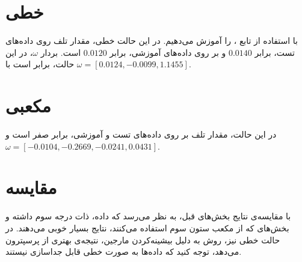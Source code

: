 \documentclass[a4paper]{article}
\begin{document}
\section{
خطی
}
 با استفاده از تابع 
،
را آموزش می‌دهیم. در این حالت خطی، مقدار تلف روی داده‌های تست، برابر 
$0.0140$
و بر روی داده‌های آموزشی، برابر 
$0.0120$
است. بردار 
$\omega$،
در این حالت، برابر است با
$\omega = [
0.0124,
-0.0099,
1.1455]$.


\section{
مکعبی
}
در این حالت، مقدار تلف بر روی داده‌های تست و آموزشی، برابر صفر است و 
$\omega =
[-0.0104,
-0.2669,
-0.0241,
0.0431]
$.

\section{مقایسه}
با مقایسه‌ی نتایج بخش‌های قبل، به نظر می‌رسد که داده‌‌، ذات درجه سوم داشته و بخش‌های که از مکعب ستون سوم استفاده‌ می‌کنند، نتایج بسیار خوبی می‌دهند. در حالت خطی نیز، روش 
 به دلیل بیشینه‌کردن مارجین، نتیجه‌ی بهتری از پرسپترون می‌دهد، توجه کنید که داده‌ها به صورت خطی قابل جدا‌سازی نیستند.
\end{document}
